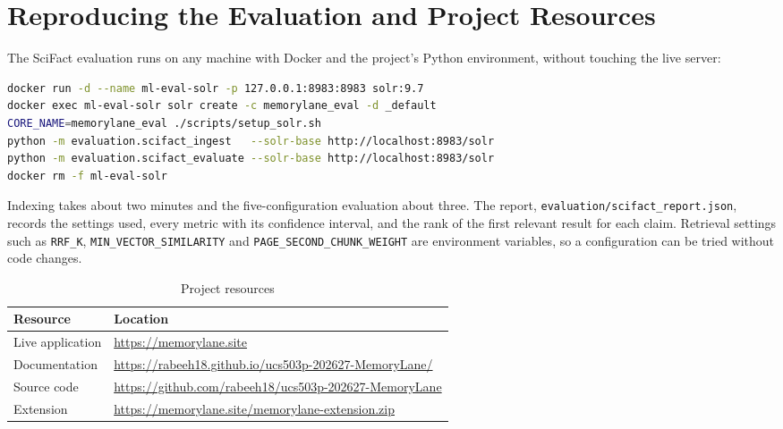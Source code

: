 
\chapter{Reproducing the Evaluation and Project Resources}
\label{app:reproduce}

The SciFact evaluation runs on any machine with Docker and the project's
Python environment, without touching the live server:

\begin{lstlisting}[language=bash]
docker run -d --name ml-eval-solr -p 127.0.0.1:8983:8983 solr:9.7
docker exec ml-eval-solr solr create -c memorylane_eval -d _default
CORE_NAME=memorylane_eval ./scripts/setup_solr.sh
python -m evaluation.scifact_ingest   --solr-base http://localhost:8983/solr
python -m evaluation.scifact_evaluate --solr-base http://localhost:8983/solr
docker rm -f ml-eval-solr
\end{lstlisting}

Indexing takes about two minutes and the five-configuration evaluation about
three. The report, \texttt{evaluation/scifact\_report.json}, records the
settings used, every metric with its confidence interval, and the rank of
the first relevant result for each claim. Retrieval settings such as
\texttt{RRF\_K}, \texttt{MIN\_VECTOR\_SIMILARITY} and
\texttt{PAGE\_SECOND\_CHUNK\_WEIGHT} are environment variables, so a
configuration can be tried without code changes.

\begin{table}[!htbp]
\centering
\small
\begin{tabularx}{\textwidth}{p{} L}
\toprule
\textbf{Resource} & \textbf{Location} \\
\midrule
Live application & \url{https://memorylane.site} \\
Documentation & \url{https://rabeeh18.github.io/ucs503p-202627-MemoryLane/} \\
Source code & \url{https://github.com/rabeeh18/ucs503p-202627-MemoryLane} \\
Extension & \url{https://memorylane.site/memorylane-extension.zip} \\
\bottomrule
\end{tabularx}
\caption{Project resources}
\label{tab:resources}
\end{table}
